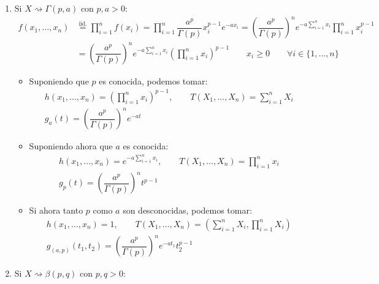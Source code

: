 \begin{ejercicio}
\begin{enumerate}[label=\alph*)]
            
        \item Si $X\rightsquigarrow\Gamma(p,a)$ con $p,a>0$:
            \begin{align*}
                f(x_1, \ldots, x_n) &\stackrel{\text{iid.}}{=} \prod_{i=1}^{n}f(x_i) = \prod_{i=1}^{n} \dfrac{a^p}{\Gamma(p)} x_i^{p-1} e^{-ax_i} = {\left(\dfrac{a^p}{\Gamma(p)}\right)}^{n} e^{-a\sum\limits_{i=1}^{n}x_i} \prod_{i=1}^{n}x_i^{p-1} \\ 
                                    &= {\left(\dfrac{a^p}{\Gamma(p)}\right)}^{n} e^{-a\sum\limits_{i=1}^{n}x_i} {\left(\prod_{i=1}^{n}x_i\right)}^{p-1} \qquad x_i \geq 0 \qquad \forall i \in \{1,\ldots,n\}
            \end{align*}
            \begin{itemize}
                \item Suponiendo que $p$ es conocida, podemos tomar:
                    \begin{gather*}
                        h(x_1, \ldots, x_n) = {\left(\prod_{i=1}^{n}x_i\right)}^{p-1}, \qquad  T(X_1, \ldots, X_n) = \sum_{i=1}^{n} X_i \\
                        g_a(t) = {\left(\dfrac{a^p}{\Gamma(p)}\right)}^{n}e^{-at}
                    \end{gather*}
                \item Suponiendo ahora que $a$ es conocida:
                    \begin{gather*}
                        h(x_1, \ldots, x_n) = e^{-a\sum\limits_{i=1}^n x_i}, \qquad T(X_1, \ldots, X_n) = \prod_{i=1}^{n}x_i \\
                        g_p(t) = {\left(\dfrac{a^p}{\Gamma(p)}\right)}^{n} t^{p-1}
                    \end{gather*}
                \item Si ahora tanto $p$ como $a$ son desconocidas, podemos tomar:
                    \begin{gather*}
                        h(x_1, \ldots, x_n) = 1, \qquad T(X_1, \ldots, X_n) = \left(\sum_{i=1}^{n}X_i, \prod_{i=1}^{n} X_i\right) \\
                        g_{(a,p)}(t_1,t_2) = {\left(\dfrac{a^p}{\Gamma(p)}\right)}^{n}e^{-at_1}t_2^{p-1}
                    \end{gather*}
            \end{itemize}
        \item Si $X\rightsquigarrow\beta(p,q)$ con $p,q>0$:
            \begin{align*}

\end{align*}
\end{enumerate}
\end{ejercicio}
